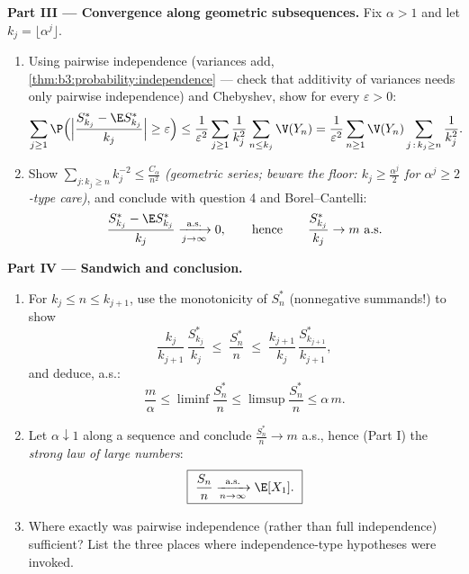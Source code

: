 \begin{problem}
\medskip
\noindent\textbf{Part III --- Convergence along geometric
subsequences.} Fix $\alpha > 1$ and let $k_j =
\lfloor\alpha^j\rfloor$.
\begin{enumerate}[resume]
  \item Using pairwise independence (variances add,
        \cref{thm:b3:probability:independence} --- check that
        additivity of variances needs only pairwise
        independence) and Chebyshev, show for every
        $\varepsilon > 0$:
        \[
        \sum_{j\geq1}\P\Bigl(\Bigl|
        \frac{S^*_{k_j} - \E S^*_{k_j}}{k_j}\Bigr| \geq
        \varepsilon\Bigr)
        \leq
        \frac1{\varepsilon^2}\sum_{j\geq1}\frac1{k_j^2}
        \sum_{n\leq k_j}\V(Y_n)
        = \frac1{\varepsilon^2}\sum_{n\geq1}\V(Y_n)
        \sum_{j\,:\,k_j\geq n}\frac1{k_j^2} .
        \]
  \item Show $\sum_{j : k_j \geq n}k_j^{-2} \leq
        \frac{C_\alpha}{n^2}$ \emph{(geometric series;
        beware the floor: $k_j \geq \frac{\alpha^j}2$ for
        $\alpha^j \geq 2$-type care)}, and conclude with
        question 4 and Borel--Cantelli:
        \[
        \frac{S^*_{k_j} - \E S^*_{k_j}}{k_j}
        \xrightarrow[j\to\infty]{\text{a.s.}} 0,
        \qquad\text{hence}\qquad
        \frac{S^*_{k_j}}{k_j} \to m \ \text{a.s.}
        \]
\end{enumerate}

\medskip
\noindent\textbf{Part IV --- Sandwich and conclusion.}
\begin{enumerate}[resume]
  \item For $k_j \leq n \leq k_{j+1}$, use the monotonicity
        of $S^*_n$ (nonnegative summands!) to show
        \[
        \frac{k_j}{k_{j+1}}\,\frac{S^*_{k_j}}{k_j}
        \;\leq\; \frac{S^*_n}{n} \;\leq\;
        \frac{k_{j+1}}{k_j}\,\frac{S^*_{k_{j+1}}}{k_{j+1}},
        \]
        and deduce, a.s.:
        \[
        \frac m\alpha \leq \liminf\frac{S^*_n}n \leq
        \limsup\frac{S^*_n}n \leq \alpha\,m .
        \]
  \item Let $\alpha \downarrow 1$ along a sequence and
        conclude $\frac{S_n^*}n \to m$ a.s., hence (Part I)
        the \emph{strong law of large numbers}:
        \[
        \boxed{\ \frac{S_n}{n}
        \xrightarrow[n\to\infty]{\text{a.s.}} \E[X_1].\ }
        \]
  \item Where exactly was pairwise independence (rather than
        full independence) sufficient? List the three places
        where independence-type hypotheses were invoked.
\end{enumerate}


\end{problem}
